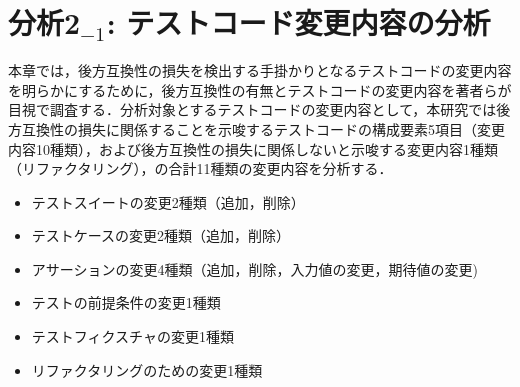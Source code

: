 \documentclass[submit]{ipsj}
\begin{document}


\section{分析2$_{-1}$: テストコード変更内容の分析}\label{sec:contentAnalysis}

本章では，後方互換性の損失を検出する手掛かりとなるテストコードの変更内容を明らかにするために，後方互換性の有無とテストコードの変更内容を著者らが目視で調査する．分析対象とするテストコードの変更内容として，本研究では後方互換性の損失に関係することを示唆するテストコードの構成要素5項目（変更内容10種類），および後方互換性の損失に関係しないと示唆する変更内容1種類（リファクタリング），の合計11種類の変更内容を分析する．

\begin{itemize}
  \item テストスイートの変更2種類（追加，削除）
  \item テストケースの変更2種類（追加，削除）
  \item アサーションの変更4種類（追加，削除，入力値の変更，期待値の変更)
  \item テストの前提条件の変更1種類
  \item テストフィクスチャの変更1種類
  \item リファクタリングのための変更1種類  
\end{itemize}
\vspace{-4mm}
\end{document}
